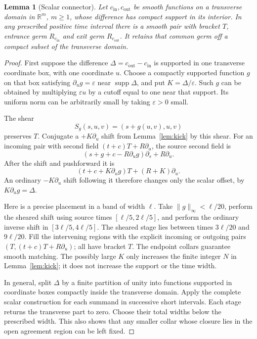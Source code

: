 \documentclass[11pt]{article}
\newtheorem{lemma}[theorem]{Lemma}
\theoremstyle{remark}
\begin{document}
\begin{lemma}[Scalar connector]\label{lem:scalar}
Let $c_{\mathrm{in}},c_{\mathrm{out}}$ be smooth functions on a transverse domain in $\mathbb R^m$, $m\ge1$, whose difference has compact support in its interior. In any prescribed positive time interval there is a smooth pair with bracket $T$, entrance germ $R_{c_{\mathrm{in}}}$ and exit germ $R_{c_{\mathrm{out}}}$. It retains that common germ off a compact subset of the transverse domain.
\end{lemma}

\begin{proof}
First suppose the difference $\Delta=c_{\mathrm{out}}-c_{\mathrm{in}}$ is supported in one transverse coordinate box, with one coordinate $u$. Choose a compactly supported function $g$ on that box satisfying $\partial_ug=\varepsilon$ near $\operatorname{supp}\Delta$, and put $K=\Delta/\varepsilon$. Such $g$ can be obtained by multiplying $\varepsilon u$ by a cutoff equal to one near that support. Its uniform norm can be arbitrarily small by taking $\varepsilon>0$ small.

The shear
$$
 S_g(s,u,v)=(s+g(u,v),u,v)
$$
preserves $T$. Conjugate a $+K\partial_u$ shift from Lemma~\ref{lem:kick} by this shear. For an incoming pair with second field $(t+c)T+R\partial_u$, the source second field is
$$
 (s+g+c-R\partial_ug)\partial_s+R\partial_u.
$$
After the shift and pushforward it is
$$
 (t+c+K\partial_ug)T+(R+K)\partial_u.
$$
An ordinary $-K\partial_u$ shift following it therefore changes only the scalar offset, by $K\partial_ug=\Delta$.

Here is a precise placement in a band of width $\ell$. Take $\|g\|_\infty<\ell/20$, perform the sheared shift using source times $[\ell/5,2\ell/5]$, and perform the ordinary inverse shift in $[3\ell/5,4\ell/5]$. The sheared stage lies between times $3\ell/20$ and $9\ell/20$. Fill the intervening regions with the explicit incoming or outgoing pairs $(T,(t+c)T+R\partial_u)$; all have bracket $T$. The endpoint collars guarantee smooth matching. The possibly large $K$ only increases the finite integer $N$ in Lemma~\ref{lem:kick}; it does not increase the support or the time width.

In general, split $\Delta$ by a finite partition of unity into functions supported in coordinate boxes compactly inside the transverse domain. Apply the complete scalar construction for each summand in successive short intervals. Each stage returns the transverse part to zero. Choose their total widths below the prescribed width. This also shows that any smaller collar whose closure lies in the open agreement region can be left fixed.
\end{proof}
\end{document}
